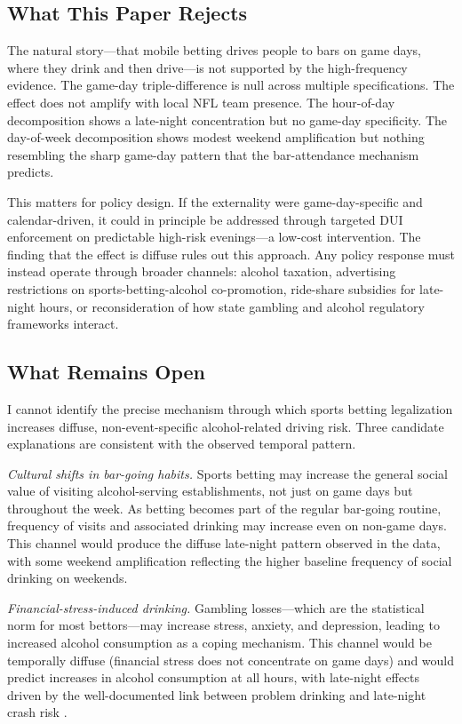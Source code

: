 \documentclass[12pt]{article}
\begin{document}
\subsection{What This Paper Rejects}

The natural story---that mobile betting drives people to bars on game days, where they drink and then drive---is not supported by the high-frequency evidence. The game-day triple-difference is null across multiple specifications. The effect does not amplify with local NFL team presence. The hour-of-day decomposition shows a late-night concentration but no game-day specificity. The day-of-week decomposition shows modest weekend amplification but nothing resembling the sharp game-day pattern that the bar-attendance mechanism predicts.

This matters for policy design. If the externality were game-day-specific and calendar-driven, it could in principle be addressed through targeted DUI enforcement on predictable high-risk evenings---a low-cost intervention. The finding that the effect is diffuse rules out this approach. Any policy response must instead operate through broader channels: alcohol taxation, advertising restrictions on sports-betting-alcohol co-promotion, ride-share subsidies for late-night hours, or reconsideration of how state gambling and alcohol regulatory frameworks interact.

\subsection{What Remains Open}

I cannot identify the precise mechanism through which sports betting legalization increases diffuse, non-event-specific alcohol-related driving risk. Three candidate explanations are consistent with the observed temporal pattern.

\textit{Cultural shifts in bar-going habits.} Sports betting may increase the general social value of visiting alcohol-serving establishments, not just on game days but throughout the week. As betting becomes part of the regular bar-going routine, frequency of visits and associated drinking may increase even on non-game days. This channel would produce the diffuse late-night pattern observed in the data, with some weekend amplification reflecting the higher baseline frequency of social drinking on weekends.

\textit{Financial-stress-induced drinking.} Gambling losses---which are the statistical norm for most bettors---may increase stress, anxiety, and depression, leading to increased alcohol consumption as a coping mechanism. This channel would be temporally diffuse (financial stress does not concentrate on game days) and would predict increases in alcohol consumption at all hours, with late-night effects driven by the well-documented link between problem drinking and late-night crash risk \citep{Levitt2001}.
\end{document}
